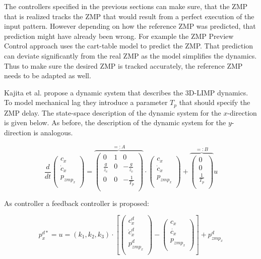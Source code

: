 \documentclass[english,ngerman]{KITreprt}
\begin{document}
The controllers specified in the previous sections can make sure, that
the ZMP that is realized tracks the ZMP that would result from a perfect
execution of the input pattern. However depending on how the reference
ZMP was predicted, that prediction might have already been wrong. For
example the ZMP Preview Control approach uses the cart-table model to
predict the ZMP. That prediction can deviate significantly from the real
ZMP as the model simplifies the dynamics. Thus to make sure the desired
ZMP is tracked accurately, the reference ZMP needs to be adapted as
well.

Kajita et al. propose a dynamic system that describes the 3D-LIMP
dynamics. To model mechanical lag they introduce a parameter $T_p$ that
should specify the ZMP delay. The state-space description of the dynamic
system for the $x$-direction is given below. As before, the description
of the dynamic system for the $y$-direction is analogous.

\begin{equation} \label{eq:dyn-system-adaption}
\frac{d}{dt} \left(\begin{array}{c}
c_x \\
\dot{c}_x \\
p_{zmp_x} \\
\end{array} \right)
=
\overbrace{
\left(\begin{array}{ccc}
0 & 1 & 0\\
\frac{g}{z_c} & 0 & -\frac{g}{z_c} \\
0 & 0 & -\frac{1}{T_p} \\
\end{array}\right)
}^{ =: A}
\cdot
\left(\begin{array}{c}
c_x \\
\dot{c}_x \\
p_{zmp_x} \\
\end{array}\right)
+
\overbrace{
\left(\begin{array}{c}
0 \\
0 \\
\frac{1}{T_p} \\
\end{array}\right)
}^{ =: B}
u
\end{equation}

As controller a feedback controller is proposed:

\begin{equation}
p^{d*}_x = u = (k_1, k_2, k_3) \cdot
\left[
\left(\begin{array}{c}
c^d_x \\
\dot{c}^d_x \\
p^d_{zmp_x} \\
\end{array}\right)
-
\left(\begin{array}{c}
c_x \\
\dot{c_x} \\
p_{zmp_x} \\
\end{array}\right)
\right]
+ p^d_{zmp_x}
\end{equation}
\end{document}
